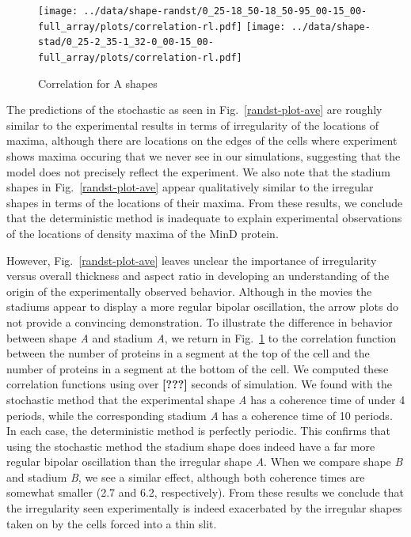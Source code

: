 \documentclass[letterpaper,twocolumn,amsmath,amssymb,pre]{revtex4-1}
\newcommand{\red}[1]{{\bf \color{red} #1}}
\newcommand{\fixme}[1]{\red{[#1]}}
\begin{document}
\begin{figure}
  \texttt{[image: ../data/shape-randst/0\_25-18\_50-18\_50-95\_00-15\_00-full\_array/plots/correlation-rl.pdf]}
  \texttt{[image: ../data/shape-stad/0\_25-2\_35-1\_32-0\_00-15\_00-full\_array/plots/correlation-rl.pdf]}
  \caption{Correlation for A shapes}
  \label{fig:corr-pancake-A}
\end{figure}

The predictions of the stochastic as seen in
Fig.~\ref{randst-plot-ave} are roughly similar to the experimental
results in terms of irregularity of the locations of maxima, although
there are locations on the edges of the cells where experiment shows
maxima occuring that we never see in our simulations, suggesting that
the model does not precisely reflect the experiment.  We also note
that the stadium shapes in Fig.~\ref{randst-plot-ave} appear
qualitatively similar to the irregular shapes in terms of the
locations of their maxima.  From these results, we conclude that the
deterministic method is inadequate to explain experimental
observations of the locations of density maxima of the MinD protein.

However, Fig.~\ref{randst-plot-ave} leaves unclear the importance of
irregularity versus overall thickness and aspect ratio in developing
an understanding of the origin of the experimentally observed
behavior.  Although in the movies the stadiums appear to display a
more regular bipolar oscillation, the arrow plots do not provide a
convincing demonstration.  To illustrate the difference in behavior
between shape \emph{A} and stadium \emph{A}, we return in
Fig.~\ref{fig:corr-pancake-A} to the correlation function between the
number of proteins in a segment at the top of the cell and the number
of proteins in a segment at the bottom of the cell.  We computed these
correlation functions using over \fixme{???} seconds of simulation.
We found with the stochastic method that the experimental shape
\emph{A} has a coherence time of under 4 periods, while the
corresponding stadium \emph{A} has a coherence time of 10 periods.  In
each case, the deterministic method is perfectly periodic. This
confirms that using the stochastic method the stadium shape does
indeed have a far more regular bipolar oscillation than the irregular
shape \emph{A}.  When we compare shape \emph{B} and stadium \emph{B},
we see a similar effect, although both coherence times are somewhat
smaller (2.7 and 6.2, respectively).  From these results we conclude
that the irregularity seen experimentally is indeed exacerbated by the
irregular shapes taken on by the cells forced into a thin slit.
\end{document}
